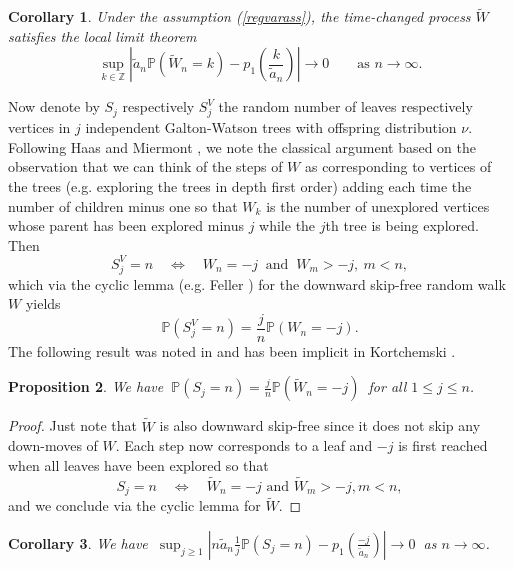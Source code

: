 \documentclass[11pt,a4paper]{article}
\newtheorem{prop}{Proposition}[section]
\newtheorem{cor}[prop]{Corollary}
\newcommand{\bP}{\mathbb{P}}
\newcommand{\bZ}{\mathbb{Z}}
\begin{document}
\begin{cor}\label{loclim} Under the assumption {\rm(\ref{regvarass})}, the time-changed process $\widetilde{W}$ satisfies the local limit theorem $$\sup_{k\in\bZ}\left|\widetilde{a}_n\bP(\widetilde{W}_n=k)-p_1\left(\frac{k}{\widetilde{a}_n}\right)\right|\rightarrow 0\qquad\mbox{as $n\rightarrow\infty$.}$$
\end{cor}
Now denote by $S_j$ respectively $S_j^V$ the random number of leaves respectively vertices in $j$ independent Galton-Watson trees with offspring distribution $\nu$. Following Haas and Miermont \cite{HM10}, we note the classical argument based on the observation that we can think of the steps of $W$ as corresponding to vertices of the trees (e.g. exploring the trees in depth first order) adding each time the number of children minus one so that $W_k$ is the number of unexplored vertices whose parent has been explored minus $j$ while the $j$th tree is being explored. Then
$$S_j^V=n\quad \iff\quad W_n=-j\ \mbox{ and }\ W_m>-j,\ m<n,$$
which via the cyclic lemma (e.g. Feller \cite[Lemma XII.6.1]{Fel2}) for the downward skip-free random walk $W$ yields\vspace{-0.2cm}
$$\bP(S_j^V=n)=\frac{j}{n}\bP(W_n=-j).$$
The following result was noted in \cite[Corollary 1]{Riz13} and has been implicit in Kortchemski \cite{Kor12}.
\begin{prop} We have $\ \displaystyle\bP(S_j=n)=\frac{j}{n}\bP(\widetilde{W}_n=-j)\ $ for all $1\le j\le n$.
\end{prop}
\begin{proof} Just note that $\widetilde{W}$ is also downward skip-free since it does not skip any down-moves of $W$. Each step now corresponds to a leaf and $-j$ is first reached when all leaves have been explored so that\vspace{-0.2cm}
$$S_j=n\quad \iff\quad \widetilde{W}_n=-j\mbox{ and }\widetilde{W}_m>-j,m<n,$$
and we conclude via the cyclic lemma for $\widetilde{W}$.
\end{proof}
\begin{cor} We have $\ \displaystyle\sup_{j\ge 1}\left|n\widetilde{a}_n\frac{1}{j}\bP(S_j=n)-p_1\left(\frac{-j}{\widetilde{a}_n}\right)\right|\rightarrow 0\ $ as $n\rightarrow\infty$.
\end{cor}
\end{document}
